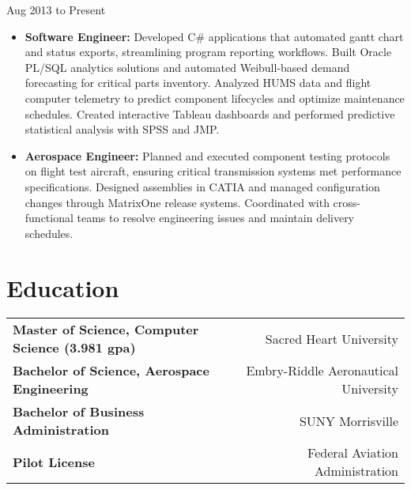 {Aug 2013 to Present}
\begin{itemize}[leftmargin=*]
    \item \textbf{Software Engineer:} Developed C\#
    applications that automated gantt chart and status exports, streamlining program reporting workflows.
    Built Oracle PL/SQL analytics solutions and automated Weibull-based demand forecasting for critical parts inventory.
    Analyzed HUMS data and flight computer telemetry to predict component lifecycles and optimize maintenance schedules.
    Created interactive Tableau dashboards and performed predictive statistical analysis with SPSS and JMP.
    \item \textbf{Aerospace Engineer:}
    Planned and executed component testing protocols on flight test aircraft, ensuring critical transmission systems met
    performance specifications. Designed assemblies in CATIA and managed configuration changes through MatrixOne release
    systems. Coordinated with cross-functional teams to resolve engineering issues and maintain delivery schedules.

\end{itemize}




\section*{Education}
\noindent
\begin{tabularx}{\textwidth}{@{}Xr@{}}
    \textbf{Master of Science, Computer Science \small{(3.981 gpa)}} & Sacred Heart University \\
    \textbf{Bachelor of Science, Aerospace Engineering} & Embry-Riddle Aeronautical University \\
    \textbf{Bachelor of Business Administration} & SUNY Morrisville \\
    \textbf{Pilot License} & Federal Aviation Administration \\
\end{tabularx}